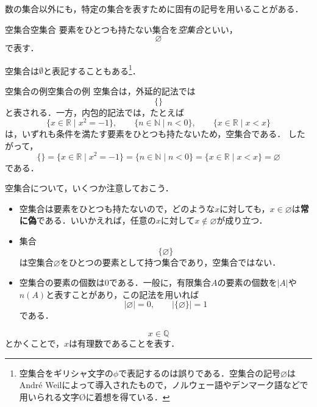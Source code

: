 数の集合以外にも，特定の集合を表すために固有の記号を用いることがある．

\begin{definition}{空集合}{空集合}
  要素をひとつも持たない集合を\emph{空集合}といい，
  \[
    \varnothing
  \]
  で表す．
\end{definition}

空集合は$\emptyset$と表記することもある\footnote{空集合をギリシャ文字の$\phi$で表記するのは誤りである．空集合の記号$\varnothing$はAndré Weilによって導入されたもので，ノルウェー語やデンマーク語などで用いられる文字Øに着想を得ている．}．

\begin{example}{空集合の例}{空集合の例}
  空集合は，外延的記法では
  \[
    \{\}
  \]
  と表される．一方，内包的記法では，たとえば
  \[
    \{x \in \mathbb{R} \mid x^2=-1\},
    \qquad
    \{n \in \mathbb{N} \mid n<0\},
    \qquad
    \{x \in \mathbb{R} \mid x<x\}
  \]
  は，いずれも条件を満たす要素をひとつも持たないため，空集合である．
  したがって，
  \[
    \{\}
    =
    \{x \in \mathbb{R} \mid x^2=-1\}
    =
    \{n \in \mathbb{N} \mid n<0\}
    =
    \{x \in \mathbb{R} \mid x<x\}
    =
    \varnothing
  \]
  である．
\end{example}

\begin{remark}[空集合に関する注意]
  空集合について，いくつか注意しておこう．
  \begin{itemize}
    \item 空集合は要素をひとつも持たないので，どのような$x$に対しても，$x \in \varnothing$は\textbf{常に偽}である．いいかえれば，任意の$x$に対して$x \notin \varnothing$が成り立つ．
    \item 集合
          \[
            \{\varnothing\}
          \]
          は空集合$\varnothing$をひとつの要素として持つ集合であり，空集合ではない．
    \item 空集合の要素の個数は$0$である．一般に，有限集合$A$の要素の個数を$|A|$や$n(A)$と表すことがあり，この記法を用いれば
          \[
            |\varnothing| = 0, \qquad |\{\varnothing\}| = 1
          \]
          である．
  \end{itemize}
\end{remark}

\begin{example}{}{}
  \[
    x \in \mathbb{Q}
  \]
  とかくことで，$x$は有理数であることを表す．
\end{example}

